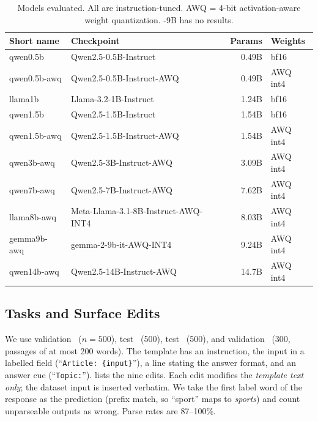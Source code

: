 \begin{table}[t]
    \centering
    \small
    \caption{Models evaluated. All are instruction-tuned. AWQ = 4-bit activation-aware weight quantization. \gemma-9B has no \ifeval results.}
    \label{tab:models}
    \begin{tabular}{@{}llrl@{}}
        \toprule
        \textbf{Short name} & \textbf{Checkpoint} & \textbf{Params} & \textbf{Weights} \\
        \midrule
        qwen0.5b & Qwen2.5-0.5B-Instruct & 0.49B & bf16 \\
        qwen0.5b-awq & Qwen2.5-0.5B-Instruct-AWQ & 0.49B & AWQ int4 \\
        llama1b & Llama-3.2-1B-Instruct & 1.24B & bf16 \\
        qwen1.5b & Qwen2.5-1.5B-Instruct & 1.54B & bf16 \\
        qwen1.5b-awq & Qwen2.5-1.5B-Instruct-AWQ & 1.54B & AWQ int4 \\
        qwen3b-awq & Qwen2.5-3B-Instruct-AWQ & 3.09B & AWQ int4 \\
        qwen7b-awq & Qwen2.5-7B-Instruct-AWQ & 7.62B & AWQ int4 \\
        llama8b-awq & Meta-Llama-3.1-8B-Instruct-AWQ-INT4 & 8.03B & AWQ int4 \\
        gemma9b-awq & gemma-2-9b-it-AWQ-INT4 & 9.24B & AWQ int4 \\
        qwen14b-awq & Qwen2.5-14B-Instruct-AWQ & 14.7B & AWQ int4 \\
        \bottomrule
    \end{tabular}
\end{table}

\subsection{Tasks and Surface Edits}

 We use \sst validation~\cite{socher2013recursive} ($n{=}500$), \agnews test~\cite{zhang2015character} (500), \emotion test~\cite{saravia2018carer} (500), and \boolq validation~\cite{clark2019boolq} (300, passages of at most 200 words). The template has an instruction, the input in a labelled field (\eg ``\texttt{Article: \{input\}}''), a line stating the answer format, and an answer cue (\eg ``\texttt{Topic:}'').  lists the nine edits. Each edit modifies the \emph{template text only}; the dataset input is inserted verbatim. We take the first label word of the response as the prediction (prefix match, so ``sport'' maps to \emph{sports}) and count unparseable outputs as wrong. Parse rates are 87--100\%.

